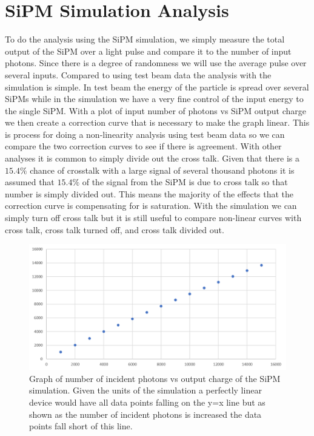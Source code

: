 \section{SiPM Simulation Analysis}

To do the analysis using the SiPM simulation, we simply measure the total output of the SiPM over a light pulse and compare it to the number of input photons. Since there is a degree of randomness we will use the average pulse over several inputs. Compared to using test beam data the analysis with the simulation is simple. In test beam the energy of the particle is spread over several SiPMs while in the simulation we have a very fine control of the input energy to the single SiPM. With a plot of input number of photons vs SiPM output charge we then create a correction curve that is necessary to make the graph linear. This is process for doing a non-linearity analysis using test beam data so we can compare the two correction curves to see if there is agreement. With other analyses it is common to simply divide out the cross talk. Given that there is a $15.4\%$ chance of crosstalk with a large signal of several thousand photons it is assumed that $15.4\%$ of the signal from the SiPM is due to cross talk so that number is simply divided out. This means the majority of the effects that the correction curve is compensating for is saturation. With the simulation we can simply turn off cross talk but it is still useful to compare non-linear curves with cross talk, cross talk turned off, and cross talk divided out.

\begin{figure}
\centering
\includegraphics[width=\linewidth]{Figures/SimNon.png}
\caption{Graph of number of incident photons vs output charge of the SiPM simulation. Given the units of the simulation a perfectly linear device would have all data points falling on the y=x line but as shown as the number of incident photons is increased the data points fall short of this line.}
\label{fig:SimNon}
\end{figure}

